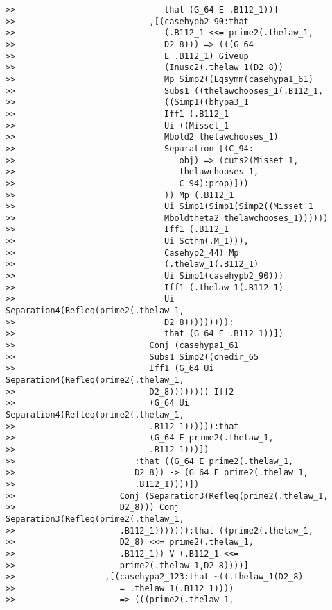 \documentclass[12pt]{article}
\begin{document}
\begin{verbatim}
>>                              that (G_64 E .B112_1))]
>>                           ,[(casehypb2_90:that
>>                              (.B112_1 <<= prime2(.thelaw_1,
>>                              D2_8))) => (((G_64
>>                              E .B112_1) Giveup
>>                              (Inusc2(.thelaw_1(D2_8))
>>                              Mp Simp2((Eqsymm(casehypa1_61)
>>                              Subs1 ((thelawchooses_1(.B112_1,
>>                              ((Simp1((bhypa3_1
>>                              Iff1 (.B112_1
>>                              Ui ((Misset_1
>>                              Mbold2 thelawchooses_1)
>>                              Separation [(C_94:
>>                                 obj) => (cuts2(Misset_1,
>>                                 thelawchooses_1,
>>                                 C_94):prop)]))
>>                              )) Mp (.B112_1
>>                              Ui Simp1(Simp1(Simp2((Misset_1
>>                              Mboldtheta2 thelawchooses_1))))))
>>                              Iff1 (.B112_1
>>                              Ui Scthm(.M_1))),
>>                              Casehyp2_44) Mp
>>                              (.thelaw_1(.B112_1)
>>                              Ui Simp1(casehypb2_90)))
>>                              Iff1 (.thelaw_1(.B112_1)
>>                              Ui Separation4(Refleq(prime2(.thelaw_1,
>>                              D2_8))))))))):
>>                              that (G_64 E .B112_1))])
>>                           Conj (casehypa1_61
>>                           Subs1 Simp2((onedir_65
>>                           Iff1 (G_64 Ui Separation4(Refleq(prime2(.thelaw_1,
>>                           D2_8)))))))) Iff2
>>                           (G_64 Ui Separation4(Refleq(prime2(.thelaw_1,
>>                           .B112_1)))))):that
>>                           (G_64 E prime2(.thelaw_1,
>>                           .B112_1)))])
>>                        :that ((G_64 E prime2(.thelaw_1,
>>                        D2_8)) -> (G_64 E prime2(.thelaw_1,
>>                        .B112_1))))])
>>                     Conj (Separation3(Refleq(prime2(.thelaw_1,
>>                     D2_8))) Conj Separation3(Refleq(prime2(.thelaw_1,
>>                     .B112_1))))))):that ((prime2(.thelaw_1,
>>                     D2_8) <<= prime2(.thelaw_1,
>>                     .B112_1)) V (.B112_1 <<=
>>                     prime2(.thelaw_1,D2_8))))]
>>                  ,[(casehypa2_123:that ~((.thelaw_1(D2_8)
>>                     = .thelaw_1(.B112_1))))
>>                     => (((prime2(.thelaw_1,

\end{verbatim}
\end{document}
